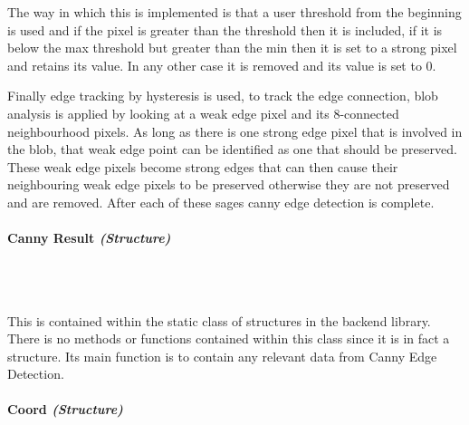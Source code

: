 \begin{FlushLeft}
\begin{enumerate}
    The way in which this is implemented is that a user threshold from the beginning is used and if the pixel is greater than the threshold then it is included, if it is below the max threshold but greater than the min then it is set to a strong pixel and retains its value. In any other case it is removed and its value is set to 0. \\ \bk

    Finally edge tracking by hysteresis is used, to track the edge connection, blob analysis is applied by looking at a weak edge pixel and its 8-connected neighbourhood pixels. As long as there is one strong edge pixel that is involved in the blob, that weak edge point can be identified as one that should be preserved. These weak edge pixels become strong edges that can then cause their neighbouring weak edge pixels to be preserved otherwise they are not preserved and are removed. After each of these sages canny edge detection is complete. \\ \bk    
    \bk


    \paragraph*{Canny Result \textit{(Structure)}} \mbox{} \\

    \begin{figure}[H]
        \centering
    \end{figure}\\

    This is contained within the static class of structures in the backend library. There is no methods or functions contained within this class since it is in fact a structure. Its main function is to contain any relevant data from Canny Edge Detection.

    \bk

    \paragraph*{Coord \textit{(Structure)}} \mbox{} \\


\end{enumerate}
\end{FlushLeft}
